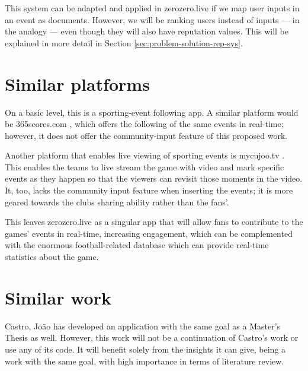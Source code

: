 \begin{enumerate}
    This system can be adapted and applied in zerozero.live if we map user inputs in an event as documents. However, we will be ranking users instead of inputs ---  in the analogy --- even though they will also have reputation values. This will be explained in more detail in Section \ref{sec:problem-solution-rep-sys}.
    
\end{enumerate} 

\section{Similar platforms}

On a basic level, this is a sporting-event following app. A similar platform would be 365scores.com \cite{365scores-about}, which offers the following of the same events in real-time; however, it does not offer the community-input feature of this proposed work.

Another platform that enables live viewing of sporting events is mycujoo.tv \cite{mycujoo-about}. This enables the teams to live stream the game with video and mark specific events as they happen so that the viewers can revisit those moments in the video. It, too, lacks the community input feature when inserting the events; it is more geared towards the clubs sharing ability rather than the fans'. 

This leaves zerozero.live as a singular app that will allow fans to contribute to the games' events in real-time, increasing engagement, which can be complemented with the enormous football-related database which can provide real-time statistics about the game.

\section{Similar work}

Castro, João \cite{PedroSousaCastro2020} has developed an application with the same goal as a Master's Thesis as well. However, this work will not be a continuation of Castro's work or use any of its code. It will benefit solely from the insights it can give, being a work with the same goal, with high importance in terms of literature review.

